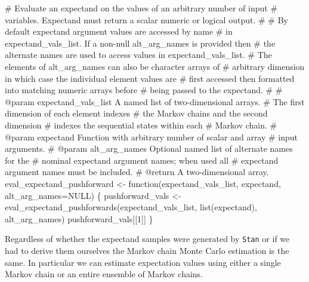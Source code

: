 \documentclass[
  letterpaper,
  DIV=11,
  numbers=noendperiod]{scrartcl}
\newenvironment{Shaded}{\begin{snugshade}}{\end{snugshade}}
\newcommand{\BuiltInTok}[1]{\textcolor[rgb]{0.00,0.23,0.31}{#1}}
\newcommand{\CommentTok}[1]{\textcolor[rgb]{0.37,0.37,0.37}{#1}}
\newcommand{\DecValTok}[1]{\textcolor[rgb]{0.68,0.00,0.00}{#1}}
\newcommand{\NormalTok}[1]{\textcolor[rgb]{0.00,0.23,0.31}{#1}}
\newcommand{\OperatorTok}[1]{\textcolor[rgb]{0.37,0.37,0.37}{#1}}
\begin{document}
\begin{Shaded}
\begin{Highlighting}[]
\CommentTok{\# Evaluate an expectand on the values of an arbitrary number of input}
\CommentTok{\# variables.  Expectand must return a scalar numeric or logical output.}
\CommentTok{\#}
\CommentTok{\# By default expectand argument values are accessed by name}
\CommentTok{\# in expectand\_vals\_list.  If a non{-}null alt\_arg\_names is provided then}
\CommentTok{\# the alternate names are used to access values in expectand\_vals\_list.}
\CommentTok{\# The elements of alt\_arg\_names can also be character arrays of}
\CommentTok{\# arbitrary dimension in which case the individual element values are}
\CommentTok{\# first accessed then formatted into matching numeric arrays before}
\CommentTok{\# being passed to the expectand.}
\CommentTok{\#}
\CommentTok{\# @param expectand\_vals\_list A named list of two{-}dimensional arrays.}
\CommentTok{\#                            The first dimension of each element indexes}
\CommentTok{\#                            the Markov chains and the second dimension}
\CommentTok{\#                            indexes the sequential states within each}
\CommentTok{\#                            Markov chain.}
\CommentTok{\# @param expectand Function with arbitrary number of scalar and array}
\CommentTok{\#                  input arguments.}
\CommentTok{\# @param alt\_arg\_names Optional named list of alternate names for the}
\CommentTok{\#                      nominal expectand argument names; when used all}
\CommentTok{\#                      expectand argument names must be included.}
\CommentTok{\# @return A two{-}dimensional array.}
\NormalTok{eval\_expectand\_pushforward }\OperatorTok{\textless{}{-}}\NormalTok{ function(expectand\_vals\_list,}
\NormalTok{                                       expectand,}
\NormalTok{                                       alt\_arg\_names}\OperatorTok{=}\NormalTok{NULL) \{}
\NormalTok{  pushforward\_vals }\OperatorTok{\textless{}{-}}\NormalTok{ eval\_expectand\_pushforwards(expectand\_vals\_list,}
                                                  \BuiltInTok{list}\NormalTok{(expectand),}
\NormalTok{                                                  alt\_arg\_names)}
\NormalTok{  pushforward\_vals[[}\DecValTok{1}\NormalTok{]]}
\NormalTok{\}}
\end{Highlighting}
\end{Shaded}

Regardless of whether the expectand samples were generated by
\texttt{Stan} or if we had to derive them ourselves the Markov chain
Monte Carlo estimation is the same. In particular we can estimate
expectation values using either a single Markov chain or an entire
ensemble of Markov chains.
\end{document}
